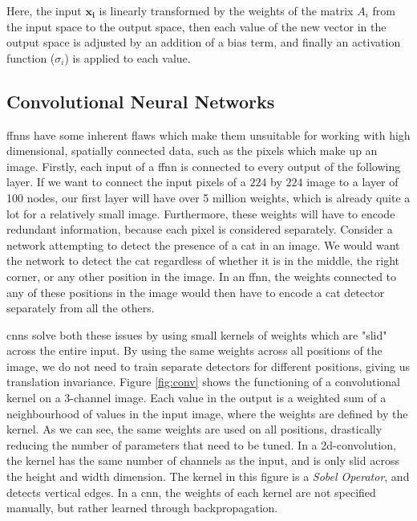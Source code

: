 \documentclass[UKenglish]{uiomasterthesis} %
\theoremstyle{definition}
\begin{document}
Here, the input $\bm{x_i}$ is linearly transformed by the weights of the matrix $A_i$ from the input space to the output space, then each value of the new vector in the output space is adjusted by an addition of a bias term, and finally an activation function ($\sigma_i$) is applied to each value. 


\subsection{Convolutional Neural Networks}

\acp{ffnn} have some inherent flaws which make them unsuitable for working with high dimensional, spatially connected data, such as the pixels which make up an image. Firstly, each input of a \ac{ffnn} is connected to every output of the following layer. If we want to connect the input pixels of a $224$ by $224$ image to a layer of 100 nodes, our first layer will have over 5 million weights, which is already quite a lot for a relatively small image. Furthermore, these weights will have to encode redundant information, because each pixel is considered separately. Consider a network attempting to detect the presence of a cat in an image. We would want the network to detect the cat regardless of whether it is in the middle, the right corner, or any other position in the image. In an \ac{ffnn}, the weights connected to any of these positions in the image would then have to encode a cat detector separately from all the others.

\acp{cnn} solve both these issues by using small kernels of weights which are "slid" across the entire input. By using the same weights across all positions of the image, we do not need to train separate detectors for different positions, giving us translation invariance. Figure \ref{fig:conv} shows the functioning of a convolutional kernel on a 3-channel image. Each value in the output is a weighted sum of a neighbourhood of values in the input image, where the weights are defined by the kernel. As we can see, the same weights are used on all positions, drastically reducing the number of parameters that need to be tuned. In a 2d-convolution, the kernel has the same number of channels as the input, and is only slid across the height and width dimension. The kernel in this figure is a {\it Sobel Operator}, and detects vertical edges. In a \ac{cnn}, the weights of each kernel are not specified manually, but rather learned through backpropagation.
\end{document}
